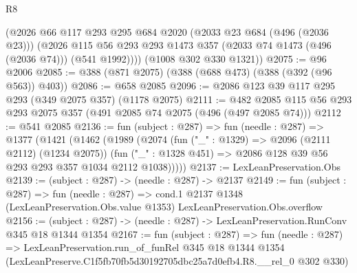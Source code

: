 \begin{lexlean}{R8}
\begin{coremodule}
        (@2026
          @66
          @117
          @293
          @295
          @684
          @2020
          (@2033 @23 @684 (@496 (@2036 @23)))
          (@2026 @115 @56 @293 @293 @1473 @357 (@2033 @74 @1473 (@496 (@2036 @74))) (@541 @1992))))
      (@1008 @302 @330 @1321))
@2075 := @96 @2006
@2085 := @388 (@871 @2075) (@388 (@688 @473) (@388 (@392 (@96 @563)) @403))
@2086 := @658 @2085
@2096 := @2086 @123 @39 @117 @295 @293 (@349 @2075 @357) (@1178 @2075)
@2111 := @482 @2085 @115 @56 @293 @293 @2075 @357 (@491 @2085 @74 @2075 (@496 (@497 @2085 @74)))
@2112 := @541 @2085
@2136 := fun (subject : @287) =>
  fun (needle : @287) =>
  @1377
    (@1421
      (@1462
        (@1989
          (@2074
            (fun ("_" : @1329) => @2096 (@2111 @2112) (@1234 @2075))
            (fun ("_" : @1328 @451) => @2086 @128 @39 @56 @293 @293 @357 @1034 @2112 @1038)))))
@2137 := LexLeanPreservation.Obs
@2139 := (subject : @287) -> (needle : @287) -> @2137
@2149 := fun (subject : @287) =>
  fun (needle : @287) =>
  cond.{1} @2137 @1348 (LexLeanPreservation.Obs.value @1353) LexLeanPreservation.Obs.overflow
@2156 := (subject : @287) -> (needle : @287) -> LexLeanPreservation.RunConv @345 @18 @1344 @1354
@2167 := fun (subject : @287) =>
  fun (needle : @287) =>
  LexLeanPreservation.run_of_funRel
    @345
    @18
    @1344
    @1354
    (LexLeanPreserve.C1f5fb70fb5d30192705dbc25a7d0efb4.R8.__rel_0 @302 @330)
\end{coremodule}
\end{lexlean}
